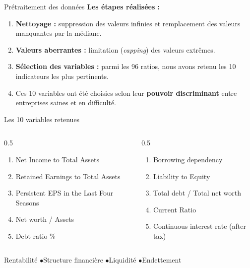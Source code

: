 \documentclass[10pt,aspectratio=169]{beamer}
\begin{document}
\begin{frame}{Prétraitement des données}
  \textbf{Les étapes réalisées :}
  \begin{enumerate}
    \item \textbf{Nettoyage :} suppression des valeurs infinies et
          remplacement des valeurs manquantes par la médiane.
    \pause
    \item \textbf{Valeurs aberrantes :} limitation (\textit{capping}) des
          valeurs extrêmes.
    \pause
    \item \textbf{Sélection des variables :} parmi les 96 ratios, nous
          avons retenu les \alert{10 indicateurs les plus pertinents}.
    \pause
    \item Ces 10 variables ont été choisies selon leur \textbf{pouvoir
          discriminant} entre entreprises saines et en difficulté.
  \end{enumerate}
\end{frame}

\begin{frame}{Les 10 variables retenues}
  \begin{columns}[T]
    \begin{column}{0.5\textwidth}
      \begin{enumerate}
        \small
        \item Net Income to Total Assets
        \item Retained Earnings to Total Assets
        \item Persistent EPS in the Last Four Seasons
        \item Net worth / Assets
        \item Debt ratio \%
      \end{enumerate}
    \end{column}
    \begin{column}{0.5\textwidth}
      \begin{enumerate}
        \small
        \setcounter{enumi}{5}
        \item Borrowing dependency
        \item Liability to Equity
        \item Total debt / Total net worth
        \item Current Ratio
        \item Continuous interest rate (after tax)
      \end{enumerate}
    \end{column}
  \end{columns}
  \vfill
  \begin{exampleblock}{}
    \centering
    \small Rentabilité \quad$\bullet$\quad Structure financière
    \quad$\bullet$\quad Liquidité \quad$\bullet$\quad Endettement
  \end{exampleblock}
\end{frame}
\end{document}
